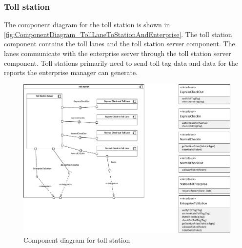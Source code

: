 \subsubsection*{Toll station}
The component diagram for the toll station is shown in \autoref{fig:ComponentDiagram_TollLaneToStationAndEnterprise}. The toll station component contains the toll lanes and the toll station server component. The lanes communicate with the enterprise server through the toll station server component. Toll stations primarily need to send toll tag data and data for the reports the enterprise manager can generate.
\begin{figure}[H]
\centering
\includegraphics[width=1\textwidth]{img/component_diagrams/componentdiagram_tolllanetostationandenterprise}
\caption{Component diagram for toll station}
\label{fig:ComponentDiagram_TollLaneToStationAndEnterprise}
\end{figure}

